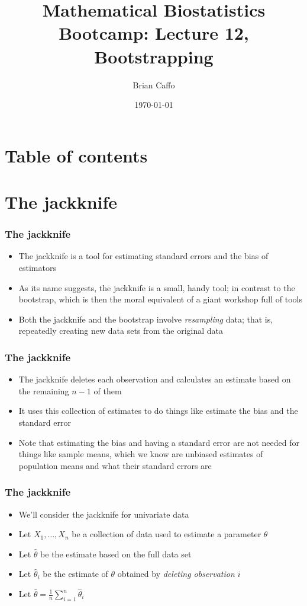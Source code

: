 \documentclass[aspectratio=169]{beamer}
\title{Mathematical Biostatistics Bootcamp: Lecture 12, Bootstrapping}
\author{Brian Caffo}
\date{\today}
\institute[Department of Biostatistics]{
  Department of Biostatistics \\
  Johns Hopkins Bloomberg School of Public Health\\
  Johns Hopkins University
}
\begin{document}
\frame{\titlepage}


\section{Table of contents}

\section{The jackknife}
\begin{frame}\frametitle{The jackknife}
\begin{itemize}
\item The jackknife is a tool for estimating standard errors 
  and the bias of estimators 
\item As its name suggests, the jackknife is a small, handy tool; in contrast to
  the bootstrap, which is then the moral equivalent of a
  giant workshop full of tools
\item Both the jackknife and the bootstrap involve {\em resampling}
  data; that is, repeatedly creating new data sets from the original
  data
\end{itemize}
\end{frame}

\begin{frame}\frametitle{The jackknife}
  \begin{itemize}
\item The jackknife deletes each observation and calculates an estimate
  based on the remaining $n-1$ of them
\item It uses this collection of estimates to do things like estimate
  the bias and the standard error
\item Note that estimating the bias and having a standard error are
  not needed for things like sample means, which we know are unbiased
  estimates of population means and what their standard errors are
  \end{itemize}
\end{frame}

\begin{frame}\frametitle{The jackknife}
  \begin{itemize}
  \item We'll consider the jackknife for univariate data
  \item Let $X_1,\ldots,X_n$ be a collection of data used to estimate
    a parameter $\theta$
  \item Let $\hat \theta$ be the estimate based on the full data set
  \item Let $\hat \theta_{i}$ be the estimate of $\theta$ obtained by
    {\em deleting observation $i$}
  \item Let $\bar \theta = \frac{1}{n}\sum_{i=1}^n \hat \theta_{i}$
  \end{itemize}  
\end{frame}
\end{document}
